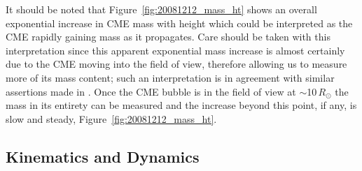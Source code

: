 It should be noted that Figure~\ref{fig:20081212_mass_ht} shows an overall exponential increase in CME mass with height which could be interpreted as the CME rapidly gaining mass as it propagates. Care should be taken with this interpretation since this apparent exponential mass increase is almost certainly due to the CME moving into the field of view, therefore allowing us to measure more of its mass content; such an interpretation is in agreement with similar assertions made in \citet{vour2010}. Once the CME bubble is in the field of view at $\sim$10\,$R_{\odot}$ the mass in its entirety can be measured and the increase beyond this point, if any, is slow and steady, Figure~\ref{fig:20081212_mass_ht}.



\subsection{Kinematics and Dynamics}\label{sec:2}

